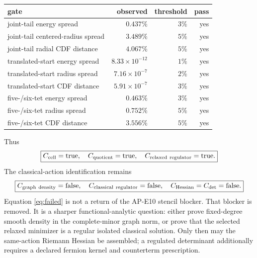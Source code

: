 \documentclass[11pt]{article}
\begin{document}
\begin{center}
\begin{tabular}{@{}lrrr@{}}
\toprule
gate & observed & threshold & pass\\
\midrule
joint-tail energy spread & $0.437\%$ & $3\%$ & yes\\
joint-tail centered-radius spread & $3.489\%$ & $5\%$ & yes\\
joint-tail radial CDF distance & $4.067\%$ & $5\%$ & yes\\
translated-start energy spread & $8.33\times10^{-12}$ & $1\%$ & yes\\
translated-start radius spread & $7.16\times10^{-7}$ & $2\%$ & yes\\
translated-start CDF distance & $5.91\times10^{-7}$ & $3\%$ & yes\\
five-/six-tet energy spread & $0.463\%$ & $3\%$ & yes\\
five-/six-tet radius spread & $0.752\%$ & $5\%$ & yes\\
five-/six-tet CDF distance & $3.556\%$ & $5\%$ & yes\\
\bottomrule
\end{tabular}
\end{center}

Thus
\begin{equation}
 \boxed{C_{\rm cell}=\mathrm{true},\quad
 C_{\rm quotient}=\mathrm{true},\quad
 C_{\rm relaxed\ regulator}=\mathrm{true}.}
 \label{eq:passed}
\end{equation}
The classical-action identification remains
\begin{equation}
 \boxed{C_{\rm graph\ density}=\mathrm{false},\quad
 C_{\rm classical\ regulator}=\mathrm{false},\quad
 C_{\rm Hessian}=C_{\det}=\mathrm{false}.}
 \label{eq:failed}
\end{equation}
Equation \eqref{eq:failed} is not a return of the AP-E10 stencil blocker.
That blocker is removed.  It is a sharper functional-analytic question:
either prove fixed-degree smooth density in the complete-minor graph norm, or
prove that the selected relaxed minimizer is a regular isolated classical
solution.  Only then may the same-action Riemann Hessian be assembled; a
regulated determinant additionally requires a declared fermion kernel and
counterterm prescription.



\end{document}
